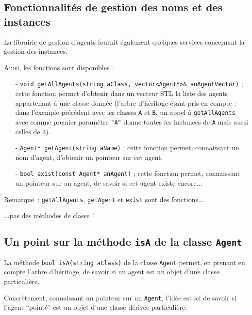 \documentclass[12pt]{article}
\begin{document}
\vspace{0.3cm}

\subsection{Fonctionnalit\'es de gestion des noms et des instances}

\vspace{0.3cm}

La librairie de gestion d'agents fournit \'egalement quelques services
concernant la gestion des instances.

Ainsi, les fonctions sont disponibles~:
\begin{itemize}
\vspace{0.1cm}
\item[-] {\tt void getAllAgents(string aClass,
           vector<Agent*>\& anAgentVector)} ;
cette fonction permet d'obtenir dans un vecteur STL la
liste des agents appartenant \`a une classe donn\'ee
(l'arbre d'h\'eritage \'etant pris en compte~:
dans l'exemple pr\'ec\'edent avec les classes {\tt A} et {\tt B},
un appel \`a {\tt getAllAgents} avec comme premier
param\`etre {\tt "A"} donne toutes les instances de {\tt A} mais aussi
celles de {\tt B}).
\vspace{0.1cm}
\item[-] {\tt Agent* getAgent(string aName)} ;
cette fonction permet, connaissant un nom d'agent, d'obtenir
un pointeur sur cet agent.
\vspace{0.1cm}
\item[-] {\tt bool exist(const Agent* anAgent)} ; 
cette fonction permet, connaissant un pointeur sur un agent,
de savoir si cet agent existe encore... 
\end{itemize}

Remarque~: {\tt getAllAgents}, {\tt getAgent} et {\tt exist}
sont des fonctions...

\hspace{2.25cm}...pas des m\'ethodes de classe~!

\subsection{Un point sur la m\'ethode
{\tt isA} de la classe {\tt Agent}}
\label{isA}

La m\'ethode {\tt bool isA(string aClass)} de la classe {\tt Agent}
permet, en prenant en compte l'arbre d'h\'eritage, de savoir si un
agent est un objet d'une classe particuli\`ere.

Concr\`etement, 
connaissant un pointeur sur un {\tt Agent},
l'id\'ee est ici de savoir si l'agent ``point\'e'' est un objet
d'une classe d\'eriv\'ee particuli\`ere.
\end{document}
